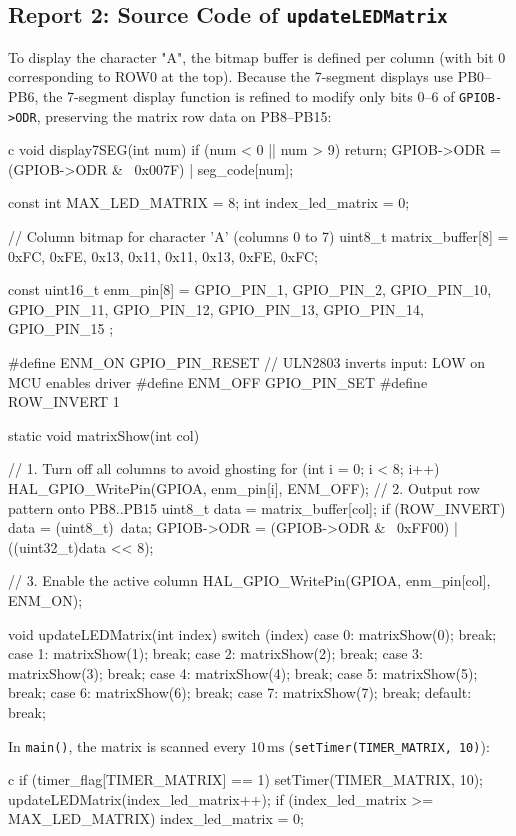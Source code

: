 \documentclass{hcmut-report}
\begin{document}
\subsection*{Report 2: Source Code of \texttt{updateLEDMatrix}}
To display the character "A", the bitmap buffer is defined per column (with bit 0 corresponding to ROW0 at the top). Because the 7-segment displays use PB0--PB6, the 7-segment display function is refined to modify only bits 0--6 of \texttt{GPIOB->ODR}, preserving the matrix row data on PB8--PB15:
\begin{code}{c}
void display7SEG(int num) {
    if (num < 0 || num > 9) return;
    GPIOB->ODR = (GPIOB->ODR & ~0x007F) | seg_code[num];
}

const int MAX_LED_MATRIX = 8;
int index_led_matrix = 0;

// Column bitmap for character 'A' (columns 0 to 7)
uint8_t matrix_buffer[8] = {0xFC, 0xFE, 0x13, 0x11, 0x11, 0x13, 0xFE, 0xFC};

const uint16_t enm_pin[8] = {
    GPIO_PIN_1,  GPIO_PIN_2,  GPIO_PIN_10, GPIO_PIN_11,
    GPIO_PIN_12, GPIO_PIN_13, GPIO_PIN_14, GPIO_PIN_15
};

#define ENM_ON     GPIO_PIN_RESET  // ULN2803 inverts input: LOW on MCU enables driver
#define ENM_OFF    GPIO_PIN_SET
#define ROW_INVERT 1

static void matrixShow(int col) {
    // 1. Turn off all columns to avoid ghosting
    for (int i = 0; i < 8; i++) {
        HAL_GPIO_WritePin(GPIOA, enm_pin[i], ENM_OFF);
    }
    // 2. Output row pattern onto PB8..PB15
    uint8_t data = matrix_buffer[col];
    if (ROW_INVERT) data = (uint8_t)~data;
    GPIOB->ODR = (GPIOB->ODR & ~0xFF00) | ((uint32_t)data << 8);

    // 3. Enable the active column
    HAL_GPIO_WritePin(GPIOA, enm_pin[col], ENM_ON);
}

void updateLEDMatrix(int index) {
    switch (index) {
        case 0: matrixShow(0); break;
        case 1: matrixShow(1); break;
        case 2: matrixShow(2); break;
        case 3: matrixShow(3); break;
        case 4: matrixShow(4); break;
        case 5: matrixShow(5); break;
        case 6: matrixShow(6); break;
        case 7: matrixShow(7); break;
        default: break;
    }
}
\end{code}

In \texttt{main()}, the matrix is scanned every $10\,\text{ms}$ (\texttt{setTimer(TIMER\_MATRIX, 10)}):
\begin{code}{c}
if (timer_flag[TIMER_MATRIX] == 1) {
    setTimer(TIMER_MATRIX, 10);
    updateLEDMatrix(index_led_matrix++);
    if (index_led_matrix >= MAX_LED_MATRIX) index_led_matrix = 0;
}
\end{code}
\end{document}
